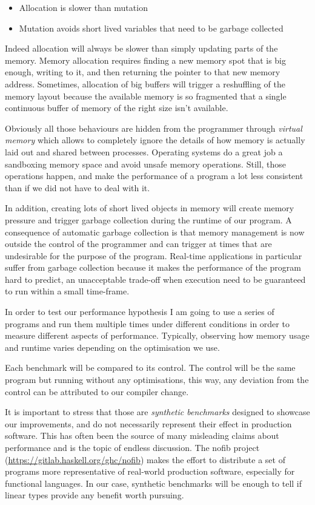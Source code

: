 \documentclass[
]{article}
\providecommand{\tightlist}{%
  \setlength{\itemsep}{0pt}\setlength{\parskip}{0pt}}
\begin{document}
\begin{itemize}
\tightlist
\item
  Allocation is slower than mutation
\item
  Mutation avoids short lived variables that need to be garbage
  collected
\end{itemize}

Indeed allocation will always be slower than simply updating parts of
the memory. Memory allocation requires finding a new memory spot that is
big enough, writing to it, and then returning the pointer to that new
memory address. Sometimes, allocation of big buffers will trigger a
reshuffling of the memory layout because the available memory is so
fragmented that a single continuous buffer of memory of the right size
isn't available.

Obviously all those behaviours are hidden from the programmer through
\emph{virtual memory} which allows to completely ignore the details of
how memory is actually laid out and shared between processes. Operating
systems do a great job a sandboxing memory space and avoid unsafe memory
operations. Still, those operations happen, and make the performance of
a program a lot less consistent than if we did not have to deal with it.

In addition, creating lots of short lived objects in memory will create
memory pressure and trigger garbage collection during the runtime of our
program. A consequence of automatic garbage collection is that memory
management is now outside the control of the programmer and can trigger
at times that are undesirable for the purpose of the program. Real-time
applications in particular suffer from garbage collection because it
makes the performance of the program hard to predict, an unacceptable
trade-off when execution need to be guaranteed to run within a small
time-frame.

In order to test our performance hypothesis I am going to use a series
of programs and run them multiple times under different conditions in
order to measure different aspects of performance. Typically, observing
how memory usage and runtime varies depending on the optimisation we
use.

Each benchmark will be compared to its control. The control will be the
same program but running without any optimisations, this way, any
deviation from the control can be attributed to our compiler change.

It is important to stress that those are \emph{synthetic benchmarks}
designed to showcase our improvements, and do not necessarily represent
their effect in production software. This has often been the source of
many misleading claims about performance and is the topic of endless
discussion. The nofib\cite{nofib} project
(\url{https://gitlab.haskell.org/ghc/nofib}) makes the effort to
distribute a set of programs more representative of real-world
production software, especially for functional languages. In our case,
synthetic benchmarks will be enough to tell if linear types provide any
benefit worth pursuing.
\end{document}
